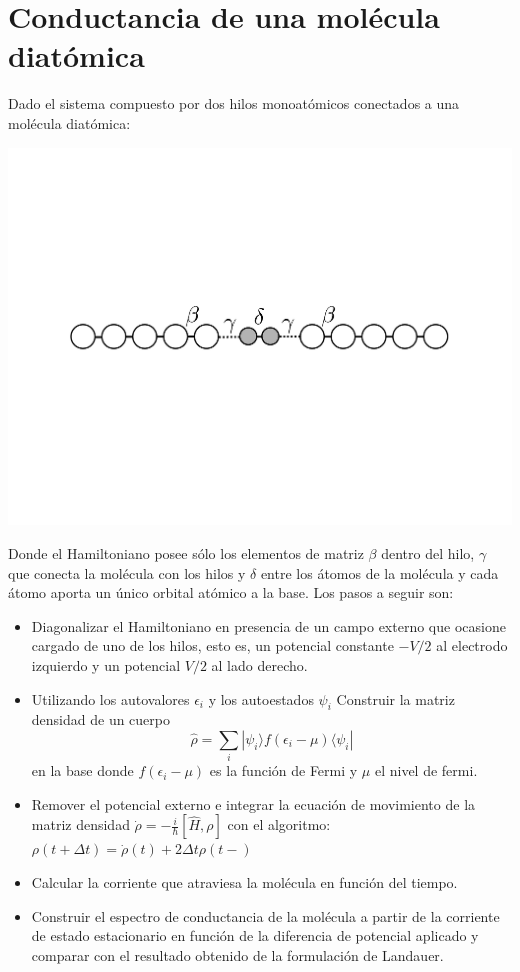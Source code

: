 \documentclass[12pt,a4paper]{article}
\begin{document}
\section{Conductancia de una molécula diatómica}
Dado el sistema compuesto por dos hilos monoatómicos conectados a una molécula diatómica:
\begin{center}
	\includegraphics[scale=0.5]{wire.pdf}
\end{center}
Donde el Hamiltoniano posee sólo los elementos de matriz $\beta$ dentro del hilo, $\gamma$ que conecta la molécula con los hilos y $\delta$ entre los átomos de la molécula y cada átomo aporta un único orbital atómico a la base. Los pasos a seguir son:
\begin{itemize}
	\item Diagonalizar el Hamiltoniano en presencia de un campo externo que ocasione cargado de uno de los hilos, esto es, un potencial constante $-V/2$ al electrodo izquierdo y un potencial $V/2$ al lado derecho.
	\item Utilizando los autovalores $\epsilon_i$ y los autoestados $\psi_i$ Construir la matriz densidad de un cuerpo
	\[\hat{\rho}=\sum_i |\psi_i\rangle f(\epsilon_i-\mu) \langle\psi_i|\]
	en la base donde $f(\epsilon_i-\mu)$ es la función de Fermi y $\mu$ el nivel de fermi.
	\item Remover el potencial externo e integrar la ecuación de movimiento de la matriz densidad $\dot{\rho}=-\frac{i}{\hbar}[\hat{H},\rho]$ con el algoritmo:
	$\rho(t+\Delta t)=\dot{\rho}(t)+2 \Delta t \rho(t-)$
	\item Calcular la corriente que atraviesa la molécula en función del tiempo.
	\item Construir el espectro de conductancia de la molécula a partir de la corriente de estado estacionario en función de la diferencia de potencial aplicado y comparar con el resultado obtenido de la formulación de Landauer.
\end{itemize}
\end{document}
